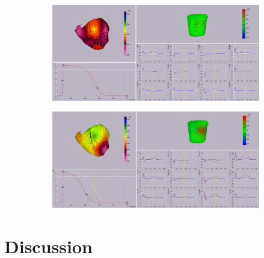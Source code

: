 \documentclass[12pt]{article}
\begin{document}
\begin{figure}[H]
	\centering
	\begin{subfigure}{\textwidth}
		\centering
		\includegraphics[width = \textwidth]{Figures/baselineBSO.png}
		\caption{}
		\label{BSP:Baseline}
	\end{subfigure}
	\begin{subfigure}{\textwidth}
		\centering
		\includegraphics[width = \textwidth]{Figures/AltAPD_BSP.png}
		\caption{}
		\label{BSP:alt}
	\end{subfigure}

	
	\caption{}
	\label{fig:BSP}
\end{figure}

\section{Discussion}




\end{document}

